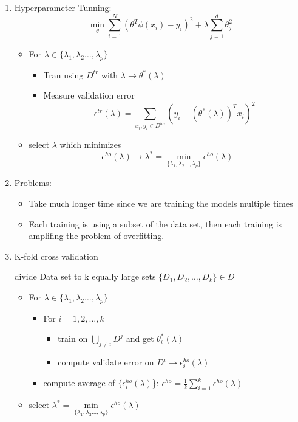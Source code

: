 \documentclass[12pt]{article}
\begin{document}
        \begin{enumerate}
            \item Hyperparameter Tunning:
            $$\min_{\theta} \sum_{i = 1}^{N}(\theta^T\phi(x_i) - y_i)^2 + \lambda \sum_{j = 1}^d \theta_j^2$$

            \begin{itemize}
                \item For $\lambda \in \{\lambda_1, \lambda_2 \dots, \lambda_p\}$
                \begin{itemize}
                    \item Tran using $D^{tr}$ with $\lambda \rightarrow \theta^*(\lambda)$
                    \item Measure validation error $$\epsilon^{tr}(\lambda) = \sum_{x_i,y_i \in D^{ho} } (y_i - (\theta^*(\lambda))^Tx_i)^2$$
                \end{itemize}
                \item select $\lambda$ which minimizes $$\epsilon^{ho}(\lambda)  \rightarrow \lambda^* =  \min_{\{\lambda_1, \lambda_2 \dots, \lambda_p\}}\epsilon^{ho}(\lambda)$$
            \end{itemize}

            \item Problems:
            \begin{itemize}
                \item Take much longer time since we are training the models multiple times
                \item Each training is using a subset of the data set, then each training is amplifing the problem of overfitting.
            \end{itemize}

            \item K-fold cross validation
            
            divide Data set to k equally large sets $\{D_1, D_2, \dots, D_k\} \in D$

            \begin{itemize}
                \item For $\lambda \in \{\lambda_1, \lambda_2 \dots, \lambda_p\}$
                \begin{itemize}
                    \item For $i = 1,2, \dots, k$
                    \begin{itemize}
                        \item train on $\bigcup\limits_{j\ne i}D^j$ and get $\theta_i^*(\lambda)$
                        \item compute validate error on $D^i \rightarrow \epsilon^{ho}_i(\lambda)$
                    \end{itemize}
                    \item compute average of $\{\epsilon_i^{ho}(\lambda)$\}: $\epsilon^{ho} = \frac{1}{k}\sum_{i = 1}^{k}\epsilon^{ho}(\lambda)$
                \end{itemize}
                \item select $\lambda^* = \min\limits_{\{\lambda_1, \lambda_2 \dots, \lambda_p\}}\epsilon^{ho}(\lambda)$
            \end{itemize}


\end{enumerate}
\end{document}
